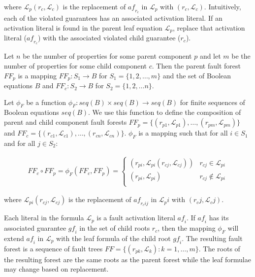 where $\mathcal{L}_p(r_c, \mathcal{L}_c)$ is the replacement of $\mathit{af_{r_c}}$ in $\mathcal{L}_p$ with $(r_c, \mathcal{L}_c)$. Intuitively, each of the violated guarantees has an associated activation literal. If an activation literal is found in the parent leaf equation $\mathcal{L}_p$, replace that activation literal ($\mathit{af_{r_c}}$) with the associated violated child guarantee ($\mathit{r_c}$). 


Let $n$ be the number of properties for some parent component $p$ and let $m$ be the number of properties for some child component $c$. Then the parent fault forest $\mathit{FF}_p$ is a mapping $\mathit{FF}_p : S_1 \rightarrow B$ for $S_1 = \{1,2,\dots,m\}$ and the set of Boolean equations $B$ and $\mathit{FF}_c: S_2 \rightarrow B$ for $S_2 = \{1,2,\dots n\}$. 

Let $\phi_F$ be a function $\phi _F: \mathit{seq(B)} \times \mathit{seq(B)} \rightarrow \mathit{seq(B)}$ for finite sequences of Boolean equations $\mathit{seq(B)}$. We use this function to define the composition of parent and child component fault forests $\mathit{FF}_p = \{(r_{p1},\mathcal{L}_{p1}), \dots, (r_ {pm}, \mathcal{L}_{pm})\}$ and $\mathit{FF}_c = \{(r_{c1},\mathcal{L}_{c1}), \dots, (r_ {cn}, \mathcal{L}_{cn})\}$. $\phi_F$ is a mapping such that for all $i \in S_1$ and for all $j \in S_2$: 

\begin{gather}
\mathit{FF}_c \circ \mathit{FF}_p = \phi_F(\mathit{FF}_c, \mathit{FF}_p) =\begin{cases} 
      (r_{pi}, \mathcal{L}_{pi}(r_{cj}, \mathcal{L}_{cj})) & r_{cj} \in \mathcal{L}_{pi} \\
      (r_{pi}, \mathcal{L}_{pi}) & r_{cj} \not\in \mathcal{L}_{pi} \\
   \end{cases}
\end{gather}

where $\mathcal{L}_{pi}(r_{cj}, \mathcal{L}_{cj})$ is the replacement of $\mathit{af_{r_cij}}$ in $\mathcal{L}_pi$ with $(r_cj, \mathcal{L}_cj)$. 

Each literal in the formula $\mathcal{L}_p$ is a fault activation literal $\mathit{af_i}$. If $\mathit{af_i}$ has its associated guarantee $\mathit{gf_i}$ in the set of child roots $r_c$, then the mapping $\phi_F$ will extend $\mathit{af_i}$ in $\mathcal{L}_p$ with the leaf formula of the child root $\mathit{gf_i}$.  The resulting fault forest is a sequence of fault trees $\mathit{FF} = \{(r_{pk}, \mathcal{L}_{k}): k = 1,\dots,m\}$. The roots of the resulting forest are the same roots as  the parent forest while the leaf formulae may change based on replacement. 


